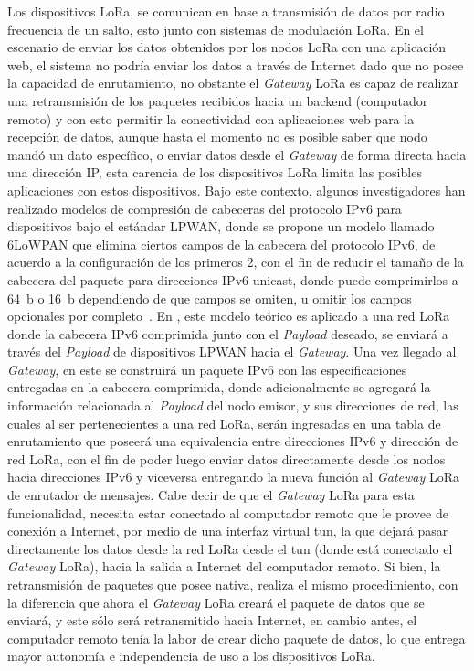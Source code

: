 \begin{justify}
Los dispositivos LoRa, se comunican en base a transmisión de datos por radio frecuencia de un salto, esto junto con sistemas de modulación LoRa. En el escenario de enviar los datos obtenidos por los nodos LoRa con una aplicación web, el sistema no podría enviar los datos a través de Internet dado que no posee la capacidad de enrutamiento, no obstante el \textit{Gateway} LoRa es capaz de realizar una retransmisión de los paquetes recibidos hacia un backend (computador remoto) y con esto permitir la conectividad con aplicaciones web para la recepción de datos, aunque hasta el momento no es posible saber que nodo mandó un dato específico, o enviar datos desde el \textit{Gateway} de forma directa hacia una dirección IP, esta carencia de los dispositivos LoRa limita las posibles aplicaciones con estos dispositivos. Bajo este contexto, algunos investigadores  han realizado modelos de compresión de cabeceras del protocolo IPv6 para dispositivos bajo el estándar LPWAN, donde se propone un modelo llamado 6LoWPAN que elimina ciertos campos de la cabecera del protocolo IPv6, de acuerdo a la configuración de los primeros \SI{2}{\byte}, con el fin de reducir el tamaño de la cabecera del paquete para direcciones IPv6 unicast, donde puede comprimirlos a \SI{64}{b} o \SI{16}{b} dependiendo de que campos se omiten, u omitir los campos opcionales por completo~\cite{lowpan}. En \cite{tomas}, este modelo teórico es aplicado a una red LoRa donde la cabecera IPv6 comprimida junto con el \textit{Payload} deseado, se enviará a través del \textit{Payload} de dispositivos LPWAN hacia el \textit{Gateway}. Una vez llegado al \textit{Gateway}, en este se construirá un paquete IPv6 con las especificaciones entregadas en la cabecera comprimida, donde adicionalmente se agregará la información relacionada al \textit{Payload} del nodo emisor, y sus direcciones de red, las cuales al ser pertenecientes a una red LoRa, serán ingresadas en una tabla de enrutamiento que poseerá una equivalencia entre direcciones IPv6 y dirección de red LoRa, con el fin de poder luego enviar datos directamente desde los nodos hacia direcciones IPv6 y viceversa entregando la nueva función al \textit{Gateway} LoRa de enrutador de mensajes.\newpage
\noindent
Cabe decir de que el \textit{Gateway} LoRa para esta funcionalidad, necesita estar conectado al computador remoto que le provee de conexión a Internet, por medio de una interfaz virtual \gls{tun}, la que dejará pasar directamente los datos desde la red LoRa desde el \gls{tun} (donde está conectado el \textit{Gateway} LoRa), hacia la salida a Internet del computador remoto. Si bien, la retransmisión de paquetes que posee nativa, realiza el mismo procedimiento, con la diferencia que ahora el \textit{Gateway} LoRa creará el paquete de datos que se enviará, y este sólo será retransmitido hacia Internet, en cambio antes, el computador remoto tenía la labor de crear dicho paquete de datos, lo que entrega mayor autonomía e independencia de uso a los dispositivos LoRa.\\

\end{justify}
